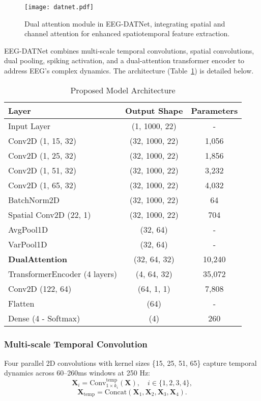 \documentclass[pdflatex,sn-mathphys-num]{sn-jnl}%
\theoremstyle{thmstyleone}
\theoremstyle{thmstyletwo}
\theoremstyle{thmstylethree}
\begin{document}
\begin{figure}[htbp]
    \centering
    \texttt{[image: datnet.pdf]}
    \caption{Dual attention module in EEG-DATNet, integrating spatial and channel attention for enhanced spatiotemporal feature extraction.}
    \label{fig:Dual Attention Module Architecture}
\end{figure}

EEG-DATNet combines multi-scale temporal convolutions, spatial convolutions, dual pooling, spiking activation, and a dual-attention transformer encoder to address EEG’s complex dynamics. The architecture (Table~\ref{tab:architecture}) is detailed below.

\begin{table}[!ht]
\centering
\caption{Proposed Model Architecture}
\label{tab:architecture}
\begin{tabular}{|l|c|c|}
\hline
\textbf{Layer} & \textbf{Output Shape} & \textbf{Parameters} \\
\hline
Input Layer & (1, 1000, 22) & - \\
Conv2D (1, 15, 32) & (32, 1000, 22) & 1,056 \\
Conv2D (1, 25, 32) & (32, 1000, 22) & 1,856 \\
Conv2D (1, 51, 32) & (32, 1000, 22) & 3,232 \\
Conv2D (1, 65, 32) & (32, 1000, 22) & 4,032 \\
BatchNorm2D & (32, 1000, 22) & 64 \\
Spatial Conv2D (22, 1) & (32, 1000, 22) & 704 \\
AvgPool1D & (32, 64) & - \\
VarPool1D & (32, 64) & - \\
\textbf{DualAttention} & (32, 64, 32) & 10,240 \\
TransformerEncoder (4 layers) & (4, 64, 32) & 35,072 \\
Conv2D (122, 64) & (64, 1, 1) & 7,808 \\
Flatten & (64) & - \\
Dense (4 - Softmax) & (4) & 260 \\
\hline
\end{tabular}
\end{table}

\subsubsection{Multi-scale Temporal Convolution}
Four parallel 2D convolutions with kernel sizes \{15, 25, 51, 65\} capture temporal dynamics across 60–260ms windows at 250 Hz:
\[
\mathbf{X}_i = \text{Conv}^{\text{temp}}_{1 \times k_i}(\mathbf{X}), \quad i \in \{1,2,3,4\},
\]
\[
\mathbf{X}_{\text{temp}} = \text{Concat}(\mathbf{X}_1, \mathbf{X}_2, \mathbf{X}_3, \mathbf{X}_4).
\]
\end{document}
